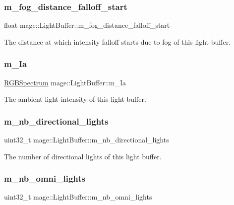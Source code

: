 \subsubsection{\texorpdfstring{m\+\_\+fog\+\_\+distance\+\_\+falloff\+\_\+start}{m\_fog\_distance\_falloff\_start}}
{\footnotesize\ttfamily float mage\+::\+Light\+Buffer\+::m\+\_\+fog\+\_\+distance\+\_\+falloff\+\_\+start}

The distance at which intensity falloff starts due to fog of this light buffer. \hypertarget{structmage_1_1_light_buffer_a1053a31ecdfdec2d4703376152f6defc}{}\label{structmage_1_1_light_buffer_a1053a31ecdfdec2d4703376152f6defc} 
\subsubsection{\texorpdfstring{m\+\_\+\+Ia}{m\_Ia}}
{\footnotesize\ttfamily \hyperlink{structmage_1_1_r_g_b_spectrum}{R\+G\+B\+Spectrum} mage\+::\+Light\+Buffer\+::m\+\_\+\+Ia}

The ambient light intensity of this light buffer. \hypertarget{structmage_1_1_light_buffer_a9f34a7342a4505a319da50bde8ad2ea4}{}\label{structmage_1_1_light_buffer_a9f34a7342a4505a319da50bde8ad2ea4} 
\subsubsection{\texorpdfstring{m\+\_\+nb\+\_\+directional\+\_\+lights}{m\_nb\_directional\_lights}}
{\footnotesize\ttfamily uint32\+\_\+t mage\+::\+Light\+Buffer\+::m\+\_\+nb\+\_\+directional\+\_\+lights}

The number of directional lights of this light buffer. \hypertarget{structmage_1_1_light_buffer_aa22f6d24cece71b0dccb37b55270c9f6}{}\label{structmage_1_1_light_buffer_aa22f6d24cece71b0dccb37b55270c9f6} 
\subsubsection{\texorpdfstring{m\+\_\+nb\+\_\+omni\+\_\+lights}{m\_nb\_omni\_lights}}
{\footnotesize\ttfamily uint32\+\_\+t mage\+::\+Light\+Buffer\+::m\+\_\+nb\+\_\+omni\+\_\+lights}

